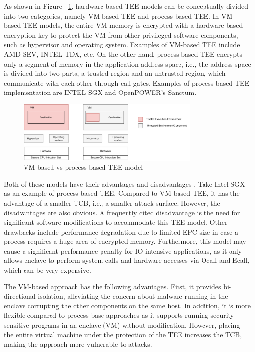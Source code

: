 As shown in Figure ~\ref{fig:vm_process_tee}, hardware-based TEE models can be conceptually divided into two categories, namely VM-based TEE and process-based TEE\cite*{101145}. In VM-based TEE models, the entire VM memory is encrypted with a hardware-based encryption key to protect the VM from other privileged 
software components, such as hypervisor and operating system. Examples of VM-based TEE include AMD SEV\cite*{AMD_SEV}, INTEL TDX\cite*{Inte_TDX}, etc. On the other hand, process-based TEE encrypts only a segment of memory in the application address space,  i.e., the address 
space is divided into two parts, a trusted region and an untrusted region, which communicate with each other through call gates. 
Examples of process-based TEE implementation 
are INTEL SGX\cite*{INTEL_SGX} and OpenPOWER's Sanctum\cite*{Costan2016SanctumMH}.
\begin{figure}[H]
  \centering
  \includegraphics[width=0.8\textwidth]{images/vm_process_tee.pdf}
  \caption[VM based vs process based TEE model]{VM based vs process based TEE model}
  \label{fig:vm_process_tee}
\end{figure}

Both of these models have their advantages and disadvantages\cite*{10.3389/fcomp.2022.930741} \cite*{Execution_Environment_landscape} \cite*{101145}. Take Intel SGX as an example of process-based TEE. Compared to VM-based TEE, it has the advantage of a smaller TCB, i.e., a smaller attack surface. However, the disadvantages are also obvious. A frequently 
cited disadvantage is the need for significant software modifications to accommodate this TEE model. Other drawbacks include performance degradation due to limited EPC size in case a process requires a huge area of encrypted memory. Furthermore, this model 
may cause a significant performance penalty for IO-intensive applications, as it only allows enclave to perform system calls and hardware accesses via Ocall and Ecall, which can be very expensive.


The VM-based approach has the following advantages. First, it provides bi-directional isolation, alleviating the concern about malware running in the enclave corrupting the other components on the same host. In addition, it is more 
flexible compared to process base approaches as it supports running security-sensitive programs in an enclave (VM) without modification. However, placing the entire virtual machine under the protection of the TEE increases the TCB, making the approach more vulnerable to attacks.


